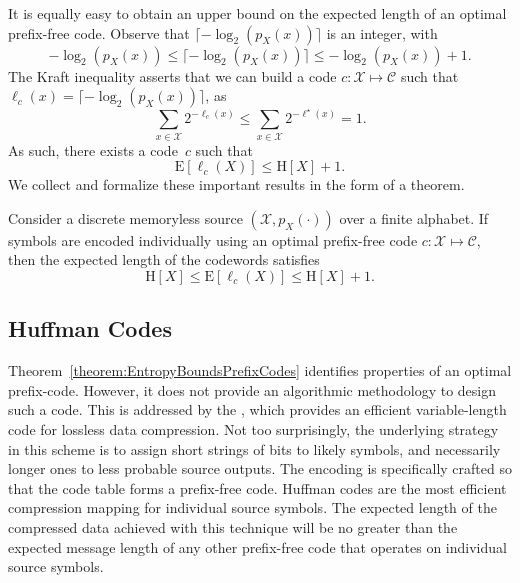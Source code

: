 It is equally easy to obtain an upper bound on the expected length of an optimal prefix-free code.
Observe that $\lceil - \log_2 (p_X(x)) \rceil$ is an integer, with
\begin{equation*}
- \log_2 (p_X(x))
\leq \lceil - \log_2 (p_X(x)) \rceil
\leq - \log_2 (p_X(x)) + 1 .
\end{equation*}
The Kraft inequality asserts that we can build a code $c : \mathcal{X} \mapsto \mathcal{C}$ such that $\ell_c(x) = \lceil - \log_2 (p_X(x)) \rceil$, as
\begin{equation*}
\sum_{x \in \mathcal{X}} 2^{- \ell_c(x)}
\leq \sum_{x \in \mathcal{X}} 2^{- \ell^{\star}(x)} = 1 .
\end{equation*}
As such, there exists a code~$c$ such that
\begin{equation*}
\mathrm{E} [\ell_c(X)] \leq \mathrm{H}[X] + 1 .
\end{equation*}
We collect and formalize these important results in the form of a theorem.

\begin{theorem} \label{theorem:EntropyBoundsPrefixCodes}
Consider a discrete memoryless source $(\mathcal{X}, p_X(\cdot))$ over a finite alphabet.
If symbols are encoded individually using an optimal prefix-free code $c : \mathcal{X} \mapsto \mathcal{C}$, then the expected length of the codewords satisfies
\begin{equation*}
\mathrm{H}[X] \leq \mathrm{E} [\ell_c(X)] \leq \mathrm{H}[X] + 1 .
\end{equation*}
\end{theorem}


\subsection{Huffman Codes}

Theorem~\ref{theorem:EntropyBoundsPrefixCodes} identifies properties of an optimal prefix-code.
However, it does not provide an algorithmic methodology to design such a code.
This is addressed by the , which provides an efficient variable-length code for lossless data compression.
Not too surprisingly, the underlying strategy in this scheme is to assign short strings of bits to likely symbols, and necessarily longer ones to less probable source outputs.
The encoding is specifically crafted so that the code table forms a prefix-free code.
Huffman codes are the most efficient compression mapping for individual source symbols.
The expected length of the compressed data achieved with this technique will be no greater than the expected message length of any other prefix-free code that operates on individual source symbols.

